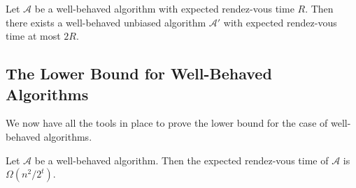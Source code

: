 \documentclass[lotsofwhite]{patmorin}
\newcommand{\A}{\mathcal{A}}
\begin{document}
\begin{lem}
Let $\A$ be a well-behaved algorithm with expected rendez-vous time
$R$.  Then there exists a well-behaved unbiased algorithm $\A'$ with
expected rendez-vous time at most $2R$.
\end{lem}

\subsection{The Lower Bound for Well-Behaved Algorithms}

We now have all the tools in place to prove the lower bound for the
case of well-behaved algorithms.

\begin{lem}
Let $\A$ be a well-behaved algorithm.  Then the expected rendez-vous
time of $\A$ is $\Omega(n^2/2^t)$.
\end{lem}
\end{document}
